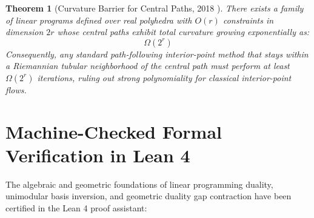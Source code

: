 \documentclass[11pt,a4paper]{article}
\newtheorem{theorem}{Theorem}[section]
\theoremstyle{definition}
\begin{document}
\begin{theorem}[Curvature Barrier for Central Paths, 2018 \cite{allamigeon2018}]\label{thm:tropical_barrier}
There exists a family of linear programs defined over real polyhedra with $O(r)$ constraints in dimension $2r$ whose central paths exhibit total curvature growing exponentially as:
\begin{equation}\label{eq:exp_curvature}
\Omega(2^r)
\end{equation}
Consequently, any standard path-following interior-point method that stays within a Riemannian tubular neighborhood of the central path must perform at least $\Omega(2^r)$ iterations, ruling out strong polynomiality for classical interior-point flows.
\end{theorem}

\section{Machine-Checked Formal Verification in Lean 4}

The algebraic and geometric foundations of linear programming duality, unimodular basis inversion, and geometric duality gap contraction have been certified in the Lean 4 proof assistant:
\end{document}
